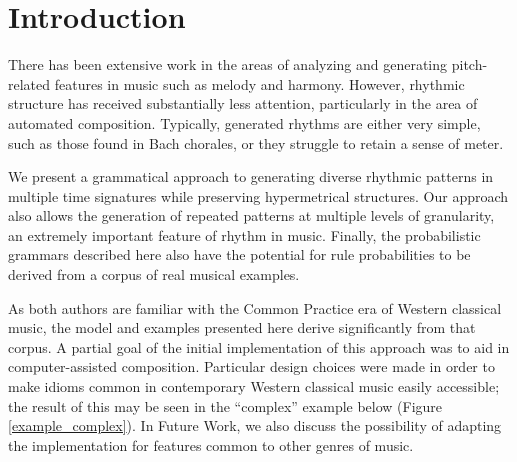 \documentclass{article}
\title{\papertitle}
\begin{document}
%
\capstartfalse
\maketitle
\capstarttrue
%
\begin{abstract}
We present an approach for generating passages of rhythm via the use of a probabilistic temporal graph grammar with rule sets that operate via recursive subdivision. This project is motivated by three factors: (1) the recognition that the literature on computer-generated rhythm is generally not as robust as those for melody and harmony; (2) the creation of more tools for computer-assisted composition; and (3) the hope that such an approach, having already produced compelling results for some styles of music, may provide insight into the structure of rhythms found in existing repertoires.
\end{abstract}


\section{Introduction}\label{sec:introduction}

There has been extensive work in the areas of analyzing and generating pitch-related features in music such as \linebreak melody and harmony. However, rhythmic structure has received substantially less attention, particularly in the area of automated composition. Typically, generated rhythms are either very simple, such as those found in Bach chorales, or they struggle to retain a sense of meter. 

We present a grammatical approach to generating diverse rhythmic patterns in multiple time signatures while preserving hypermetrical structures. Our approach also allows the generation of repeated patterns at multiple levels of granularity, an extremely important feature of rhythm in music. Finally, the probabilistic grammars described here also have the potential for rule probabilities to be derived from a corpus of real musical examples.

As both authors are familiar with the Common Practice era of Western classical music, the model and examples presented here derive significantly from that corpus. A partial goal of the initial implementation of this approach was to aid in computer-assisted composition. Particular design choices were made in order to make idioms common in contemporary Western classical music easily accessible; the result of this may be seen in the ``complex'' example below (Figure \ref{example_complex}). In Future Work, we also discuss the possibility of adapting the implementation for features common to other genres of music.
\end{document}
